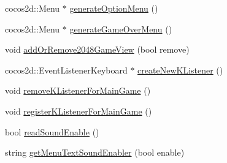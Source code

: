\begin{DoxyCompactItemize}
cocos2d\+::\+Menu $\ast$ \hyperlink{class_hello_world_a24162678657656105f59887233f9c841}{generate\+Option\+Menu} ()
\item 
cocos2d\+::\+Menu $\ast$ \hyperlink{class_hello_world_a7b22f04ccc721e47e59c4f5470768790}{generate\+Game\+Over\+Menu} ()
\item 
void \hyperlink{class_hello_world_ad3ea29ba5aa294fc4e4f8ee41833b702}{add\+Or\+Remove2048\+Game\+View} (bool remove)
\item 
cocos2d\+::\+Event\+Listener\+Keyboard $\ast$ \hyperlink{class_hello_world_ab43ad3eb748cab6180daf5a8cfdcf207}{create\+New\+K\+Listener} ()
\item 
void \hyperlink{class_hello_world_aa4aaf4a6d2ae2e0cb07273d0ee004861}{remove\+K\+Listener\+For\+Main\+Game} ()
\item 
void \hyperlink{class_hello_world_a15deb2e6546d6fd41267dc91932ade26}{register\+K\+Listener\+For\+Main\+Game} ()
\item 
bool \hyperlink{class_hello_world_a0f8c9d1b95e03b397e680b9dafb8f3d9}{read\+Sound\+Enable} ()
\item 
string \hyperlink{class_hello_world_a85e65e13718aba32a3a35044f0f694c5}{get\+Menu\+Text\+Sound\+Enabler} (bool enable)
\end{DoxyCompactItemize}
